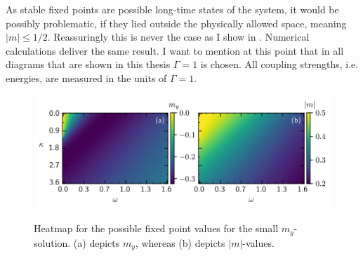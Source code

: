 As stable fixed points are possible long-time states of the system, it would be possibly problematic, if they lied outside the physically allowed space, meaning $|m|\leq1/2$. Reassuringly this is never the case as I show in . Numerical calculations deliver the same result. I want to mention at this point that in all diagrams that are shown in this thesis $\Gamma=1$ is chosen. All coupling strengths, i.e. energies, are measured in the units of $\Gamma=1$. %
%     
\begin{figure}[H]
    \caption{Heatmap for the possible fixed point values for the small $m_y$-solution. (a) depicts $m_y$, whereas (b) depicts $|m|$-values.}
    \includegraphics{pictures/fixp_bound_heatmap_s_horiz.png}
    \label{fig:fixp_small_bound_hm}
\end{figure}
